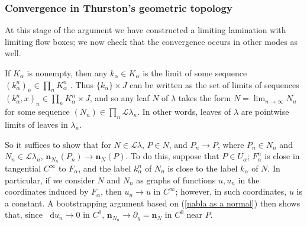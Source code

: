 \documentclass[reqno,11pt]{amsart}
\newcommand*\dif{\mathop{}\!\mathrm{d}}
\newcommand{\Leaves}{\mathscr L}
\newcommand{\normal}{\mathbf n}
\theoremstyle{definition}
\numberwithin{equation}{section}
\begin{document}
\subsubsection{Convergence in Thurston's geometric topology}
At this stage of the argument we have constructed a limiting lamination with limiting flow boxes; we now check that the convergence occurs in other modes as well.

If $K_\alpha$ is nonempty, then any $k_\alpha \in K_\alpha$ is the limit of some sequence $(k_\alpha^n)_n \in \prod_n K_\alpha^n$ \cite[Theorem 4.11]{nadler2017continuum}.
Thus $\{k_\alpha\} \times J$ can be written as the set of limits of sequences $(k_\alpha^n, x)_n \in \prod_n K_\alpha^n \times J$, and so any leaf $N$ of $\lambda$ takes the form $N = \lim_{n \to \infty} N_n$ for some sequence $(N_n) \in \prod_n \Leaves \lambda_n$.
In other words, leaves of $\lambda$ are pointwise limits of leaves in $\lambda_n$.

So it suffices to show that for $N \in \Leaves \lambda$, $P \in N$, and $P_n \to P$, where $P_n \in N_n$ and $N_n \in \Leaves \lambda_n$, $\normal_{N_n}(P_n) \to \normal_N(P)$.
To do this, suppose that $P \in U_\alpha$; $F_\alpha^n$ is close in tangential $C^\infty$ to $F_\alpha$, and the label $k^n_\alpha$ of $N_n$ is close to the label $k_\alpha$ of $N$.
In particular, if we consider $N$ and $N_n$ as graphs of functions $u, u_n$ in the coordinates induced by $F_\alpha$, then $u_n \to u$ in $C^\infty$; however, in such coordinates, $u$ is a constant.
A bootstrapping argument based on (\ref{nabla as a normal}) then shows that, since $\dif u_n \to 0$ in $C^0$, $\normal_{N_n} \to \partial_y = \normal_N$ in $C^0$ near $P$.
\end{document}
